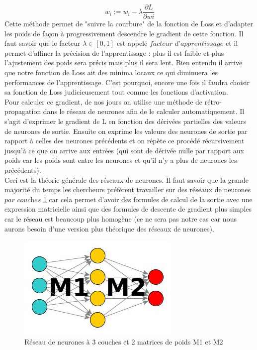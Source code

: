 \documentclass[10pt]{article}
\begin{document}
\[w_i := w_i-\lambda\frac{\partial L}{\partial wi}\]
Cette méthode permet de "suivre la courbure" de la fonction de Loss et d'adapter les poids de façon à progressivement descendre le gradient de cette fonction. Il faut savoir que le facteur $\lambda\in[0,1]$ est appelé $\textit{facteur d'apprentissage}$ et il permet d'affiner la précision de l'apprentissage : plus il est faible et plus l'ajustement des poids sera précis mais plus il sera lent. Bien entendu il arrive que notre fonction de Loss ait des minima locaux ce qui diminuera les performances de l'apprentissage. C'est pourquoi, encore une fois il faudra choisir sa fonction de Loss judicieusement tout comme les fonctions d'activation.\\
Pour calculer ce gradient, de nos jours on utilise une méthode de rétro-propagation dans le réseau de neurones afin de le calculer automatiquement. Il s'agit d'exprimer le gradient de L en fonction des dérivées partielles des valeurs de neurones de sortie. Ensuite on exprime les valeurs des neurones de sortie par rapport à celles des neurones précédents et on répète ce procédé récursivement jusqu'à ce que on arrive aux entrées (qui sont de dérivée nulle par rapport aux poids car les poids sont entre les neurones et qu'il n'y a plus de neurones les précédents).\\
Ceci est la théorie générale des réseaux de neurones. Il faut savoir que la grande majorité du temps les chercheurs préfèrent travailler sur des réseaux de neurones $\textit{par couches}$ \ref{layered_rna} car cela permet d'avoir des formules de calcul de la sortie avec une expression matricielle ainsi que des formules de descente de gradient plus simples car le réseau est beaucoup plus homogène (ce ne sera pas notre cas car nous aurons besoin d'une version plus théorique des réseaux de neurones).\\
\begin{figure}[!h]
\centering
\includegraphics[scale=0.7]{ex_layered_network.jpg}
\caption{Réseau de neurones à 3 couches et 2 matrices de poids M1 et M2}
\label{layered_rna}
\end{figure}
\end{document}
